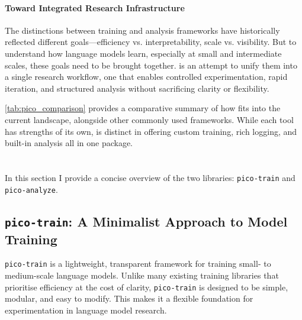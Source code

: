 
\paragraph{Toward Integrated Research Infrastructure}
The distinctions between training and analysis frameworks have historically reflected different goals—efficiency vs. interpretability, scale vs. visibility. But to understand how language models learn, especially at small and intermediate scales, these goals need to be brought together. \pico is an attempt to unify them into a single research workflow, one that enables controlled experimentation, rapid iteration, and structured analysis without sacrificing clarity or flexibility.

\cref{tab:pico_comparison} provides a comparative summary of how \pico fits into the current landscape, alongside other commonly used frameworks. While each tool has strengths of its own, \pico is distinct in offering custom training, rich logging, and built-in analysis all in one package.

\section[\picomed]{\picolarge}
\label{sec:pico-overview}

In this section I provide a concise overview of the two \pico libraries: \texttt{pico-train} and \texttt{pico-analyze}. 

\subsection{\texttt{pico-train}: A Minimalist Approach to Model Training}

\texttt{pico-train} is a lightweight, transparent framework for training small- to medium-scale language models. Unlike many existing training libraries that prioritise efficiency at the cost of clarity, \texttt{pico-train} is designed to be simple, modular, and easy to modify. This makes it a flexible foundation for experimentation in language model research.

